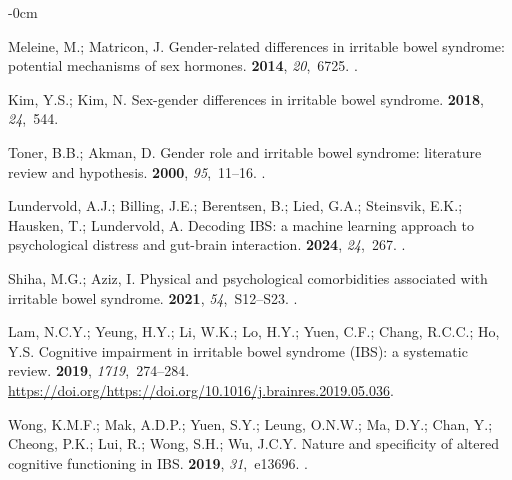 \documentclass[diagnostics,article,accept,pdftex,moreauthors]{Definitions/mdpi}
\begin{document}
\begin{adjustwidth}{-\extralength}{0cm}
\begin{thebibliography}{999}
Meleine, M.; Matricon, J.
\newblock Gender-related differences in irritable bowel syndrome: potential
  mechanisms of sex hormones.
 {\bf 2014}, {\em
  20},~6725.
.

Kim, Y.S.; Kim, N.
\newblock Sex-gender differences in irritable bowel syndrome.
 {\bf 2018}, {\em
  24},~544.

Toner, B.B.; Akman, D.
\newblock Gender role and irritable bowel syndrome: literature review and
  hypothesis.
 {\bf 2000}, {\em 95},~11--16.
.

Lundervold, A.J.; Billing, J.E.; Berentsen, B.; Lied, G.A.; Steinsvik, E.K.;
  Hausken, T.; Lundervold, A.
\newblock Decoding IBS: a machine learning approach to psychological distress
  and gut-brain interaction.
 {\bf 2024}, {\em 24},~267.
.

Shiha, M.G.; Aziz, I.
\newblock Physical and psychological comorbidities associated with irritable
  bowel syndrome.
 {\bf 2021}, {\em
  54},~S12--S23.
.

Lam, N.C.Y.; Yeung, H.Y.; Li, W.K.; Lo, H.Y.; Yuen, C.F.; Chang, R.C.C.; Ho,
  Y.S.
\newblock Cognitive impairment in irritable bowel syndrome (IBS): a systematic
  review.
 {\bf 2019}, {\em 1719},~274--284.
\newblock
  {\url{https://doi.org/https://doi.org/10.1016/j.brainres.2019.05.036}}.

Wong, K.M.F.; Mak, A.D.P.; Yuen, S.Y.; Leung, O.N.W.; Ma, D.Y.; Chan, Y.;
  Cheong, P.K.; Lui, R.; Wong, S.H.; Wu, J.C.Y.
\newblock Nature and specificity of altered cognitive functioning in IBS.
 {\bf 2019}, {\em 31},~e13696.
.


\end{thebibliography}
\end{adjustwidth}
\end{document}
